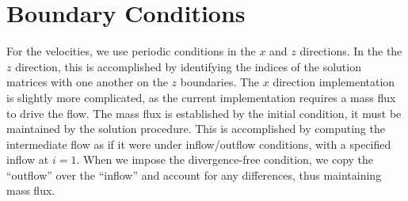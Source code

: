 \documentclass[10pt]{article}
\newcommand{\NS}{\hbox{Navier}-\hbox{Stokes}\ }
\begin{document}
\section{Boundary Conditions}\label{bc}
For the velocities, we use periodic conditions in the $x$ and $z$
directions.  In the the $z$ direction, this is accomplished by
identifying the indices of the solution matrices with one another on
the $z$ boundaries.  The $x$ direction implementation is slightly more
complicated, as the current implementation requires a mass flux to
drive the flow.  The mass flux is established by the initial
condition, it must be maintained by the solution procedure.  This is
accomplished by computing the intermediate flow as if it were under
inflow/outflow conditions, with a specified inflow at $i=1$.  When we
impose the divergence-free condition, we copy the ``outflow'' over the
``inflow'' and account for any differences, thus maintaining mass
flux.

\end{document}

